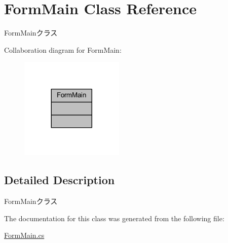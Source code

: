 \hypertarget{class_form_main}{}\section{Form\+Main Class Reference}
\label{class_form_main}


Form\+Mainクラス  




Collaboration diagram for Form\+Main\+:\nopagebreak
\begin{figure}[H]
\begin{center}
\leavevmode
\includegraphics[width=140pt]{class_form_main__coll__graph}
\end{center}
\end{figure}


\subsection{Detailed Description}
Form\+Mainクラス 

The documentation for this class was generated from the following file\+:\begin{DoxyCompactItemize}
\item 
\hyperlink{_form_main_8cs}{Form\+Main.\+cs}\end{DoxyCompactItemize}
